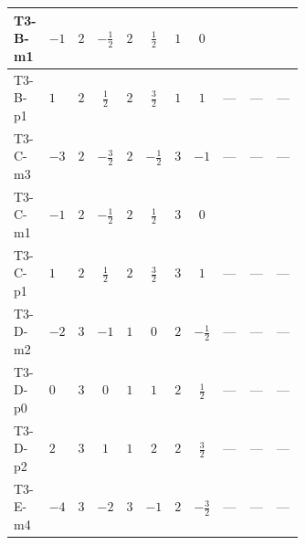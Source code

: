 \documentclass[8pt]{article}
\begin{document}
\begin{landscape}
\begin{longtable}{@{}llcccccc >{\raggedright\arraybackslash}p{0.21\linewidth} >{\raggedright\arraybackslash}p{0.21\linewidth} >{\raggedright\arraybackslash}p{0.21\linewidth}@{}}
\midrule
T3-B-m1 & $-1$ & $2$ & $-\frac{1}{2}$ & $2$ & $\frac{1}{2}$ & $1$ & $0$ & \scriptsize\adjustbox{max width=\linewidth}{$\begin{gathered} -3 {g_1}^2 {\lambda_{H H^\dagger S_1^\dagger S_2^\dagger}^{\rm Cross}}\end{gathered}$} & \scriptsize\adjustbox{max width=\linewidth}{$\begin{gathered} +2 {\lambda_{12}^{(1)}} {\lambda_{H H^\dagger S_1^\dagger S_2^\dagger}^{\rm Cross}}\end{gathered}$} & \scriptsize\adjustbox{max width=\linewidth}{$\begin{gathered} +3 {\lambda_1} {\lambda_{H H^\dagger S_1^\dagger S_2^\dagger}^{\rm Cross}}\end{gathered}$} \\
\midrule
T3-B-p1 & $1$ & $2$ & $\frac{1}{2}$ & $2$ & $\frac{3}{2}$ & $1$ & $1$ & --- & --- & --- \\
\midrule
T3-C-m3 & $-3$ & $2$ & $-\frac{3}{2}$ & $2$ & $-\frac{1}{2}$ & $3$ & $-1$ & --- & --- & --- \\
\midrule
T3-C-m1 & $-1$ & $2$ & $-\frac{1}{2}$ & $2$ & $\frac{1}{2}$ & $3$ & $0$ & \scriptsize\adjustbox{max width=\linewidth}{$\begin{gathered} -3 {g_1}^2 {\lambda_{H H^\dagger S_1^\dagger S_2^\dagger}^{\rm Cross}}\end{gathered}$} & \scriptsize\adjustbox{max width=\linewidth}{$\begin{gathered} +2 {\lambda_{12}^{(1)}} {\lambda_{H H^\dagger S_1^\dagger S_2^\dagger}^{\rm Cross}}\end{gathered}$} & \scriptsize\adjustbox{max width=\linewidth}{$\begin{gathered} +3 {\lambda_1} {\lambda_{H H^\dagger S_1^\dagger S_2^\dagger}^{\rm Cross}}\end{gathered}$} \\
\midrule
T3-C-p1 & $1$ & $2$ & $\frac{1}{2}$ & $2$ & $\frac{3}{2}$ & $3$ & $1$ & --- & --- & --- \\
\midrule
T3-D-m2 & $-2$ & $3$ & $-1$ & $1$ & $0$ & $2$ & $-\frac{1}{2}$ & --- & --- & --- \\
\midrule
T3-D-p0 & $0$ & $3$ & $0$ & $1$ & $1$ & $2$ & $\frac{1}{2}$ & --- & --- & --- \\
\midrule
T3-D-p2 & $2$ & $3$ & $1$ & $1$ & $2$ & $2$ & $\frac{3}{2}$ & --- & --- & --- \\
\midrule
T3-E-m4 & $-4$ & $3$ & $-2$ & $3$ & $-1$ & $2$ & $-\frac{3}{2}$ & --- & --- & --- \\

\end{longtable}
\end{landscape}
\end{document}
